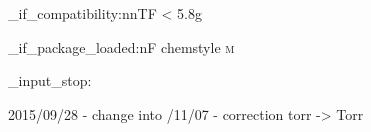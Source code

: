 %
%
%
%
%

\RequirePackage{siunitx}

\DeclareSIUnit {}
\DeclareSIUnit {}
\DeclareSIUnit {}
\DeclareSIUnit {}
\DeclareSIUnit \moLar      {\mole\per\liter}
\DeclareSIUnit \MolMass    {\gram\per\mole}
\DeclareSIUnit {}
\chemmacros_if_compatibility:nnTF {<} {5.8g}
  { \DeclareSIUnit {} }
  { \DeclareSIUnit {} }

\AtEndPreamble
  {
    \chemmacros_if_package_loaded:nF {chemstyle}
      {
        \DeclareSIUnit {\cmc  } {\cubic\centi\metre}
        \DeclareSIUnit {\molar} {\mole\per\cubic\deci\metre}
        \DeclareSIUnit {\Molar} {\textsc{m}}
      }
  }

\file_input_stop:

2015/09/28 - change \AtBeginDocument into /11/07 - correction torr -> Torr

